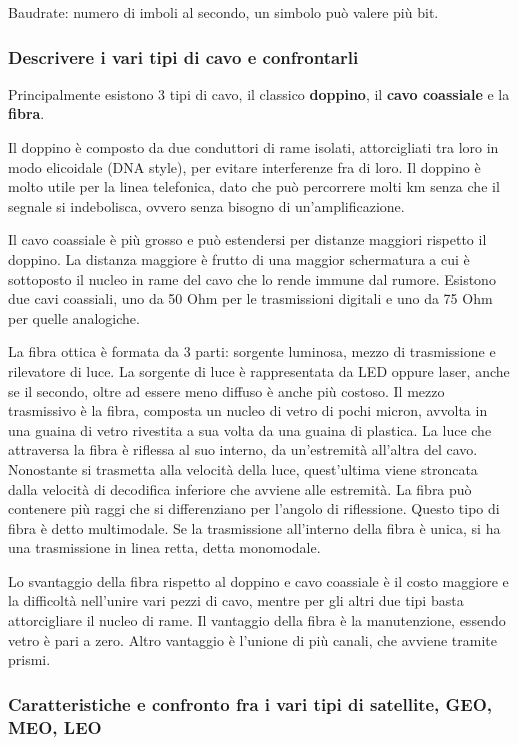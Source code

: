 Baudrate: numero di imboli al secondo, un simbolo può valere più bit.


\subsubsection{Descrivere i vari tipi di cavo e confrontarli}

Principalmente esistono 3 tipi di cavo, il classico \textbf{doppino}, il \textbf{cavo coassiale} e la \textbf{fibra}.

Il doppino è composto da due conduttori di rame isolati, attorcigliati tra loro in modo
elicoidale (DNA style), per evitare interferenze fra di loro. Il doppino è molto utile per la linea
telefonica, dato che può percorrere molti km senza che il segnale si indebolisca, ovvero senza
bisogno di un'amplificazione.

Il cavo coassiale è più grosso e può estendersi per distanze maggiori rispetto il doppino. La distanza
maggiore è frutto di una maggior schermatura a cui è sottoposto il nucleo in rame del cavo che lo
rende immune dal rumore. Esistono due cavi coassiali, uno da 50 Ohm per le trasmissioni digitali e
uno da 75 Ohm per quelle analogiche.

La fibra ottica è formata da 3 parti: sorgente luminosa, mezzo di trasmissione e rilevatore di luce. La
sorgente di luce è rappresentata da LED oppure laser, anche se il secondo, oltre ad essere meno
diffuso è anche più costoso. Il mezzo trasmissivo è la fibra, composta un nucleo di vetro di pochi
micron, avvolta in una guaina di vetro rivestita a sua volta da una guaina di plastica. La luce che
attraversa la fibra è riflessa al suo interno, da un'estremità all'altra del cavo. Nonostante si
trasmetta alla velocità della luce, quest’ultima viene stroncata dalla velocità di decodifica inferiore
che avviene alle estremità. La fibra può contenere più raggi che si differenziano per l'angolo di riflessione. Questo tipo di fibra è detto multimodale. Se la trasmissione all'interno della fibra è
unica, si ha una trasmissione in linea retta, detta monomodale.

Lo svantaggio della fibra rispetto al doppino e cavo coassiale è il costo maggiore e la difficoltà
nell'unire vari pezzi di cavo, mentre per gli altri due tipi basta attorcigliare il nucleo di rame. Il
vantaggio della fibra è la manutenzione, essendo vetro è pari a zero. Altro vantaggio è l'unione di
più canali, che avviene tramite prismi.

\subsubsection{Caratteristiche e confronto fra i vari tipi di satellite, GEO, MEO, LEO}

